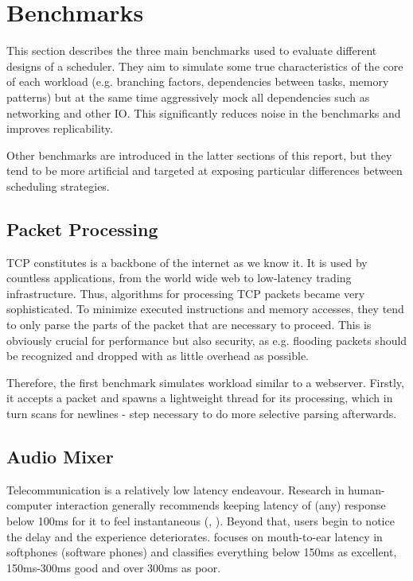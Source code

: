 \documentclass[12pt,a4paper,twoside]{report}
\begin{document}
\section{Benchmarks}


This section describes the three main benchmarks used to evaluate different designs of a scheduler. They aim to simulate some true characteristics of the core of each workload (e.g. branching factors, dependencies between tasks, memory patterns) but at the same time aggressively mock all dependencies such as networking and other IO. This significantly reduces noise in the benchmarks and improves replicability. 


Other benchmarks are introduced in the latter sections of this report, but they tend to be more artificial and targeted at exposing particular differences between scheduling strategies. 

\subsection{Packet Processing}
\label{section:background_packet-processing}
TCP constitutes is a backbone of the internet as we know it. It is used by countless applications, from the world wide web to low-latency trading infrastructure. Thus, algorithms for processing TCP packets became very sophisticated. To minimize executed instructions and memory accesses, they tend to only parse the parts of the packet that are necessary to proceed. This is obviously crucial for performance but also security, as e.g. flooding packets should be recognized and dropped with as little overhead as possible. 

Therefore, the first benchmark simulates workload similar to a webserver. Firstly, it accepts a packet and spawns a lightweight thread for its processing, which in turn scans for newlines - step necessary to do more selective parsing afterwards. 


\subsection{Audio Mixer}
\label{section:bench-audio-mixer}
Telecommunication is a relatively low latency endeavour. Research in human-computer interaction generally recommends keeping latency of (any) response below 100ms for it to feel instantaneous (\cite{Miller1968}, \cite{Amin2013}). Beyond that, users begin to notice the delay and the experience deteriorates. \cite{voip-latency} focuses on mouth-to-ear latency in softphones (software phones) and classifies everything below 150ms as excellent, 150ms-300ms good and over 300ms as poor. 
\end{document}

